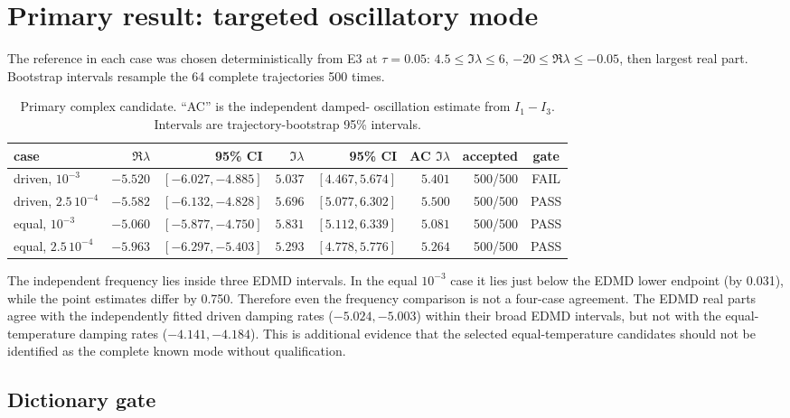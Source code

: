 \documentclass[11pt]{article}
\newcommand{\pass}{\textcolor{green!45!black}{PASS}}
\newcommand{\fail}{\textcolor{red!75!black}{FAIL}}
\begin{document}
\section{Primary result: targeted oscillatory mode}

The reference in each case was chosen deterministically from E3 at
$\tau=0.05$: $4.5\leq\Im\lambda\leq6$, $-20\leq\Re\lambda\leq-0.05$,
then largest real part. Bootstrap intervals resample the 64 complete
trajectories 500 times.

\begin{table}[H]
\centering\small
\caption{Primary complex candidate. ``AC'' is the independent damped-
oscillation estimate from $I_1-I_3$. Intervals are trajectory-bootstrap 95\%
intervals.}
\begin{tabular}{@{}lrrrrrrc@{}}
\toprule
case & $\Re\lambda$ & 95\% CI & $\Im\lambda$ & 95\% CI & AC $\Im\lambda$ & accepted & gate\\
\midrule
driven, $10^{-3}$ & $-5.520$ & $[-6.027,-4.885]$ & $5.037$ & $[4.467,5.674]$ & $5.401$ & 500/500 & \fail\\
driven, $2.5\,10^{-4}$ & $-5.582$ & $[-6.132,-4.828]$ & $5.696$ & $[5.077,6.302]$ & $5.500$ & 500/500 & \pass\\
equal, $10^{-3}$ & $-5.060$ & $[-5.877,-4.750]$ & $5.831$ & $[5.112,6.339]$ & $5.081$ & 500/500 & \pass\\
equal, $2.5\,10^{-4}$ & $-5.963$ & $[-6.297,-5.403]$ & $5.293$ & $[4.778,5.776]$ & $5.264$ & 500/500 & \pass\\
\bottomrule
\end{tabular}
\end{table}

The independent frequency lies inside three EDMD intervals. In the equal
$10^{-3}$ case it lies just below the EDMD lower endpoint (by 0.031), while the
point estimates differ by 0.750. Therefore even the frequency comparison is
not a four-case agreement. The EDMD real parts agree with the independently
fitted driven damping rates ($-5.024,-5.003$) within their broad EDMD intervals,
but not with the equal-temperature damping rates ($-4.141,-4.184$). This is
additional evidence that the selected equal-temperature candidates should not
be identified as the complete known mode without qualification.

\subsection{Dictionary gate}
\end{document}
